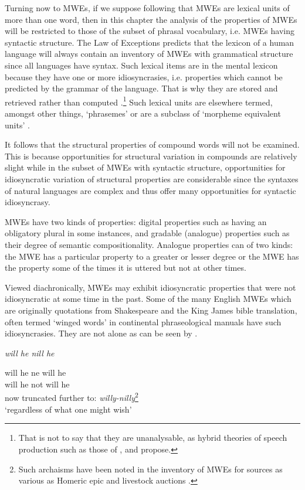 \documentclass[output=paper]{langsci/langscibook}
\begin{document}
Turning now to MWEs, if we suppose following \citet{Sag:2002} that MWEs are lexical units of more than one word, then in this chapter the analysis of the properties of MWEs will be restricted to those of the subset of phrasal vocabulary, i.e. MWEs having syntactic structure. 
The Law of Exceptions predicts that the lexicon of a human language will always contain an inventory of MWEs with grammatical structure since all languages have syntax. 
Such lexical items are in the mental lexicon because they have one or more idiosyncrasies, i.e. properties which cannot be predicted by the grammar of the language. 
That is why they are stored and retrieved rather than computed \citep{Bresnan1981}.\footnote{That is not to say that they are unanalysable, as hybrid theories of speech production such as those of \citet{Cutting1997}, \citet{Titone1999} and \citet{Sprenger2006} propose.} Such lexical units are elsewhere termed, amongst other things, ‘phrasemes’ \citep{Melcuk2012} or are a subclass of ‘morpheme equivalent units’ \citep{Wray2008}. 

It follows that the structural properties of compound words will not be examined. 
This is because opportunities for structural variation in compounds are relatively slight \citep{Selkirk1982} while in the subset of MWEs with syntactic structure, opportunities for idiosyncratic variation of structural properties are considerable since the syntaxes of natural languages are complex and thus offer many opportunities for syntactic idiosyncrasy. 

MWEs have two kinds of properties: %
digital properties such as having an obligatory plural in some 
instances, and gradable (analogue) properties such as their degree 
of semantic compositionality. Analogue properties can of two 
kinds: the MWE has a particular property to a greater or lesser
degree or the MWE has the property some of the times it is uttered 
but not at other times.

Viewed diachronically, MWEs may exhibit idiosyncratic properties that were not idiosyncratic at some time in the past. Some of the many  English MWEs which are originally quotations from Shakespeare and the King James bible translation, often termed  ‘winged words’ in continental phraseological manuals \citep{Glaeser1986} have such idiosyncrasies. They are not alone as can be seen by .

\begin{exe}
\ex\label{ex:ex01}	\textit{will he nill he} %
	\begin{xlist} 
    \ex 
     will he  ne  will he\\
	{} will he not will he \\
	\ex now truncated further to: \textit{willy-nilly}\footnote{Such archaisms have been noted in the inventory of MWEs for sources as various as Homeric epic \citep{Lord1960} and livestock auctions \citep{Kuiper1984}.}\\
	‘regardless of what one might wish’
    \end{xlist}
\end{exe}
\end{document}
